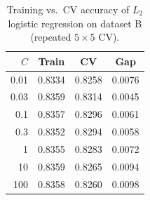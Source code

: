 \begin{table}[t]
\centering\small
\caption{Training vs.\ CV accuracy of $L_2$ logistic regression on dataset B (repeated $5\times5$ CV).}
\label{tab:reg}
\begin{tabular}{rccc}
\toprule
$C$ & Train & CV & Gap \\
\midrule
0.01 & 0.8334 & 0.8258 & 0.0076 \\
0.03 & 0.8359 & 0.8314 & 0.0045 \\
0.1 & 0.8357 & 0.8296 & 0.0061 \\
0.3 & 0.8352 & 0.8294 & 0.0058 \\
1 & 0.8355 & 0.8283 & 0.0072 \\
10 & 0.8359 & 0.8265 & 0.0094 \\
100 & 0.8358 & 0.8260 & 0.0098 \\
\bottomrule
\end{tabular}
\end{table}
